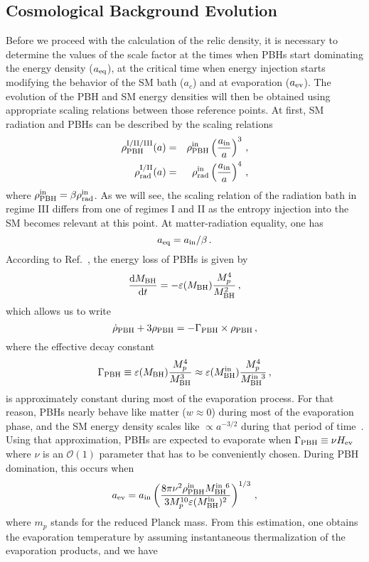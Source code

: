 \documentclass[aps,prd,reprint,twocolumn,preprintnumbers,floatfix,nofootinbib]{revtex4-1}
\newcommand{\be}{\begin{equation}}
\newcommand{\ee}{\end{equation}}
\newcommand{\bea}{\begin{eqnarray}}
\newcommand{\eea}{\end{eqnarray}}
\newcommand{\dd}{\text{d}}
\newcommand{\MBH}{M_{\rm BH}}
\begin{document}
\subsection{Cosmological Background Evolution}
Before we proceed with the calculation of the relic density, it is necessary to determine the values of the scale factor at the times when PBHs start dominating the energy density ($a_{\rm eq}$), at the critical time when energy injection starts modifying the behavior of the SM bath ($a_c$) and at evaporation ($a_{\rm ev}$). The evolution of the PBH and SM energy densities will then be obtained using appropriate scaling relations between those reference points. At first, SM radiation and PBHs can be described by the scaling relations
\bea
\rho_{\rm PBH}^{\rm I/II/III}(a)&=&\rho_{\rm PBH}^{\rm in}\left(\frac{a_{\rm in}}{a}\right)^3\,,\nonumber\\
\rho_{\rm rad}^{\rm I/II}(a)&=&\rho_{\rm rad}^{\rm in}\left(\frac{a_{\rm in}}{a}\right)^4\,,
\eea
where $\rho_{\rm PBH}^{\rm in}=\beta \rho_{\rm rad}^{\rm in}$.
As we will see, the scaling relation of the radiation bath in regime III differs from one of regimes I and II as the entropy injection into the SM becomes relevant at this point. At matter-radiation equality, one has
\be
a_{\rm eq}=a_{\rm in}/ \beta\,.
\ee
According to Ref.~\cite{Perez-Gonzalez:2020vnz}, the energy loss of PBHs is given by
\be
\frac{\dd \MBH}{\dd t}=-\varepsilon(\MBH) \frac{M_p^4}{\MBH^2}\,,
\ee
which allows us to write
\be
\dot \rho_{\rm PBH} + 3\rho_{\rm PBH}=-\Gamma_{\rm PBH}\times \rho_{\rm PBH}\,,
\ee
where the effective decay constant 
\be\Gamma_{\rm PBH}\equiv \varepsilon(\MBH) \frac{M_p^4}{\MBH^3} \approx \varepsilon(\MBH^{\rm in}) \frac{M_p^4}{\MBH^{\rm in\ 3}}\,,
\ee
is approximately constant during most of the evaporation process. For that reason, PBHs nearly behave like matter ($w\approx 0$) during most of the evaporation phase, and the SM energy density scales like $\propto a^{-3/2}$ during that period of time~\cite{Arias:2019uol}. Using that approximation, PBHs are expected to evaporate when $\Gamma_{\rm PBH}\equiv \nu H_{\rm ev}$ where $\nu$ is an $\mathcal O(1)$ parameter that has to be conveniently chosen. During PBH domination, this occurs when
\be
a_{\rm ev}=a_{\rm in}\left(\frac{8 \pi \nu^2 \rho_{\rm PBH}^{\rm in}\MBH^{\rm in~6}}{3 M_p^{10} \varepsilon(\MBH^{\rm in})^2 }\right)^{1/3}\,,
\ee
where $m_p$ stands for the reduced Planck mass. From this estimation, one obtains the evaporation temperature by assuming instantaneous thermalization of the evaporation products, and we have
\end{document}
